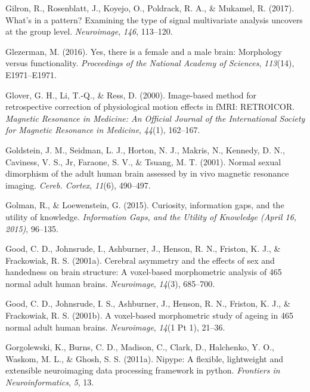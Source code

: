 \documentclass[11pt,american,a4paper,oneside,]{memoir} %
\begin{document}
\leavevmode\hypertarget{ref-Gilron2017-tl}{}%
Gilron, R., Rosenblatt, J., Koyejo, O., Poldrack, R. A., \& Mukamel, R. (2017). What's in a pattern? Examining the type of signal multivariate analysis uncovers at the group level. \emph{Neuroimage}, \emph{146}, 113--120.

\leavevmode\hypertarget{ref-Glezerman2016-xl}{}%
Glezerman, M. (2016). Yes, there is a female and a male brain: Morphology versus functionality. \emph{Proceedings of the National Academy of Sciences}, \emph{113}(14), E1971--E1971.

\leavevmode\hypertarget{ref-Glover2000-or}{}%
Glover, G. H., Li, T.-Q., \& Ress, D. (2000). Image-based method for retrospective correction of physiological motion effects in fMRI: RETROICOR. \emph{Magnetic Resonance in Medicine: An Official Journal of the International Society for Magnetic Resonance in Medicine}, \emph{44}(1), 162--167.

\leavevmode\hypertarget{ref-Goldstein2001-dy}{}%
Goldstein, J. M., Seidman, L. J., Horton, N. J., Makris, N., Kennedy, D. N., Caviness, V. S., Jr, Faraone, S. V., \& Tsuang, M. T. (2001). Normal sexual dimorphism of the adult human brain assessed by in vivo magnetic resonance imaging. \emph{Cereb. Cortex}, \emph{11}(6), 490--497.

\leavevmode\hypertarget{ref-golman2015curiosity}{}%
Golman, R., \& Loewenstein, G. (2015). Curiosity, information gaps, and the utility of knowledge. \emph{Information Gaps, and the Utility of Knowledge (April 16, 2015)}, 96--135.

\leavevmode\hypertarget{ref-Good2001-ak}{}%
Good, C. D., Johnsrude, I., Ashburner, J., Henson, R. N., Friston, K. J., \& Frackowiak, R. S. (2001a). Cerebral asymmetry and the effects of sex and handedness on brain structure: A voxel-based morphometric analysis of 465 normal adult human brains. \emph{Neuroimage}, \emph{14}(3), 685--700.

\leavevmode\hypertarget{ref-Good2001-kv}{}%
Good, C. D., Johnsrude, I. S., Ashburner, J., Henson, R. N., Friston, K. J., \& Frackowiak, R. S. (2001b). A voxel-based morphometric study of ageing in 465 normal adult human brains. \emph{Neuroimage}, \emph{14}(1 Pt 1), 21--36.

\leavevmode\hypertarget{ref-gorgolewski2011nipype}{}%
Gorgolewski, K., Burns, C. D., Madison, C., Clark, D., Halchenko, Y. O., Waskom, M. L., \& Ghosh, S. S. (2011a). Nipype: A flexible, lightweight and extensible neuroimaging data processing framework in python. \emph{Frontiers in Neuroinformatics}, \emph{5}, 13.
\end{document}
